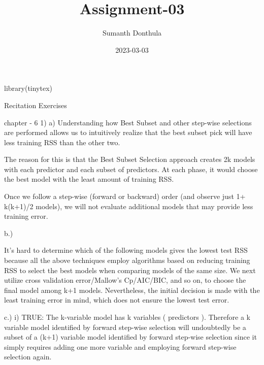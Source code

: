 \documentclass[
]{article}
\title{Assignment-03}
\author{Sumanth Donthula}
\date{2023-03-03}
\newenvironment{Shaded}{\begin{snugshade}}{\end{snugshade}}
\newcommand{\FunctionTok}[1]{\textcolor[rgb]{0.00,0.00,0.00}{#1}}
\newcommand{\NormalTok}[1]{#1}
\begin{document}
\maketitle

\begin{Shaded}
\begin{Highlighting}[]
\FunctionTok{library}\NormalTok{(tinytex)}
\end{Highlighting}
\end{Shaded}

Recitation Exercises

chapter - 6 1) a) Understanding how Best Subset and other step-wise
selections are performed allows us to intuitively realize that the best
subset pick will have less training RSS than the other two.

The reason for this is that the Best Subset Selection approach creates
2k models with each predictor and each subset of predictors. At each
phase, it would choose the best model with the least amount of training
RSS.

Once we follow a step-wise (forward or backward) order (and observe just
1+ k(k+1)/2 models), we will not evaluate additional models that may
provide less training error.

b.)

It's hard to determine which of the following models gives the lowest
test RSS because all the above techniques employ algorithms based on
reducing training RSS to select the best models when comparing models of
the same size. We next utilize cross validation error/Mallow's
Cp/AIC/BIC, and so on, to choose the final model among k+1 models.
Nevertheless, the initial decision is made with the least training error
in mind, which does not ensure the lowest test error.

c.) i) TRUE: The k-variable model has k variables ( predictors ).
Therefore a k variable model identified by forward step-wise selection
will undoubtedly be a subset of a (k+1) variable model identified by
forward step-wise selection since it simply requires adding one more
variable and employing forward step-wise selection again.
\end{document}
